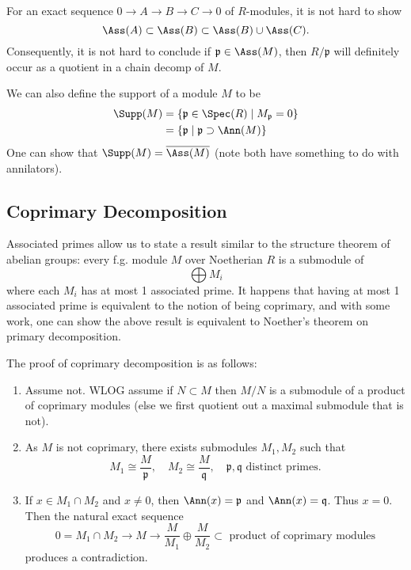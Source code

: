 For an exact sequence $0 \to A \to B \to C \to 0$ of $R$-modules, it is not hard to show
\[
    \Ass(A) \subset \Ass(B) \subset \Ass(B) \cup \Ass(C).
\]
Consequently, it is not hard to conclude if $\mathfrak p \in \Ass(M)$, then $R/\mathfrak p$ will definitely occur as a quotient in a chain decomp of $M$.

We can also define the support of a module $M$ to be
\[
    \begin{split}
        \Supp(M) & = \{\mathfrak p \in \Spec(R) \mid M_{\mathfrak p} = 0\} \\
                 & = \{\mathfrak p \mid \mathfrak p \supset \Ann(M)\}
    \end{split}
\]
One can show that $\Supp(M) = \overline{\Ass(M)}$ (note both have something to do with annilators).

\subsection{Coprimary Decomposition}
Associated primes allow us to state a result similar to the structure theorem of abelian groups: every f.g. module $M$ over Noetherian $R$ is a submodule of
\[
    \bigoplus M_i
\]
where each $M_i$ has at most 1 associated prime. It happens that having at most 1 associated prime is equivalent to the notion of being coprimary, and with some work, one can show the above result is equivalent to Noether's theorem on primary decomposition.

The proof of coprimary decomposition is as follows:
\begin{enumerate}
    \item Assume not. WLOG assume if $N \subset M$ then $M/N$ is a submodule of a product of coprimary modules (else we first quotient out a maximal submodule that is not).
    \item As $M$ is not coprimary, there exists submodules $M_1, M_2$ such that
    \[
        M_1 \cong \frac{M}{\mathfrak p}, \quad M_2 \cong \frac{M}{\mathfrak q}, \quad \mathfrak p, \mathfrak q \text{ distinct primes.}
    \]
    \item If $x \in M_1 \cap M_2$ and $x \neq 0$, then $\Ann(x) = \mathfrak p$ and $\Ann(x) = \mathfrak q$. Thus $x = 0$. Then the natural exact sequence
    \[
        0 = M_1 \cap M_2 \to M \to \frac{M}{M_1} \oplus \frac{M}{M_2} \subset \text{ product of coprimary modules}
    \]
    produces a contradiction.
\end{enumerate}

